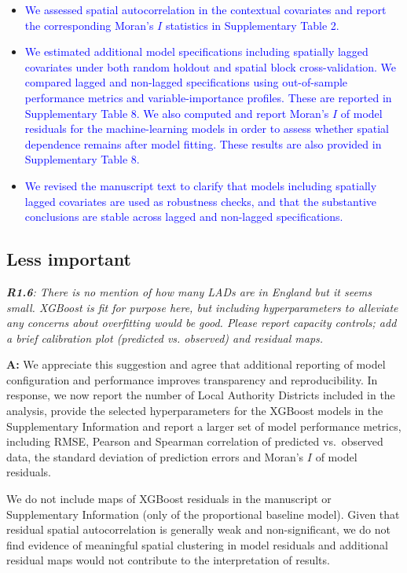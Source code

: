 \documentclass[
  letterpaper,
  DIV=11,
  numbers=noendperiod]{scrartcl}
\begin{document}
\begin{itemize}[noitemsep, topsep=0pt]
\item \textcolor{blue}{We assessed spatial autocorrelation in the contextual covariates and report the corresponding Moran’s $I$ statistics in Supplementary Table 2.}
\item \textcolor{blue}{We estimated additional model specifications including spatially lagged covariates under both random holdout and spatial block cross-validation. We compared lagged and non-lagged specifications using out-of-sample performance metrics and variable-importance profiles. These are reported in Supplementary Table 8. We also computed and report Moran’s $I$ of model residuals for the machine-learning models in order to assess whether spatial dependence remains after model fitting. These results are also provided in Supplementary Table 8.}
\item \textcolor{blue}{We revised the manuscript text to clarify that models including spatially lagged covariates are used as robustness checks, and that the substantive conclusions are stable across lagged and non-lagged specifications.}
\end{itemize}

\subsection{Less important}

\setlength{\leftskip}{0cm}\textit{\textbf{R1.6}: There is no mention of how many LADs are in England but it seems small. XGBoost is fit for purpose here, but including hyperparameters to alleviate any concerns about overfitting would be good. Please report capacity controls; add a brief calibration plot (predicted vs. observed) and residual maps.}

\setlength{\leftskip}{0.5cm}\textbf{A:} We appreciate this suggestion
and agree that additional reporting of model configuration and
performance improves transparency and reproducibility. In response, we
now report the number of Local Authority Districts included in the
analysis, provide the selected hyperparameters for the XGBoost models in
the Supplementary Information and report a larger set of model
performance metrics, including RMSE, Pearson and Spearman correlation of
predicted vs.~observed data, the standard deviation of prediction errors
and Moran's \(I\) of model residuals.

We do not include maps of XGBoost residuals in the manuscript or
Supplementary Information (only of the proportional baseline model).
Given that residual spatial autocorrelation is generally weak and
non-significant, we do not find evidence of meaningful spatial
clustering in model residuals and additional residual maps would not
contribute to the interpretation of results.
\end{document}
